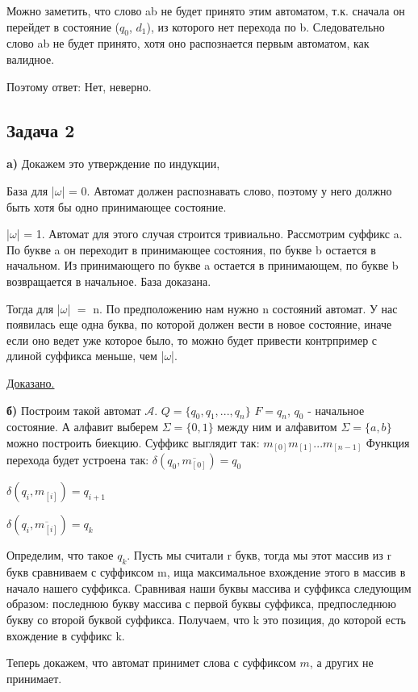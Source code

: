 \documentclass[a4paper,14pt]{article} %
\begin{document}
    Можно заметить, что слово ab не будет принято этим автоматом, т.к. сначала он перейдет в состояние ($q_0$, $d_1$), из которого нет перехода по b.
    Следовательно слово ab не будет принято, хотя оно распознается первым автоматом, как валидное.
    
    Поэтому ответ: Нет, неверно. 

\subsection{Задача 2}
\textbf{a)} Докажем это утверждение по индукции, 

База для |$\omega$| = 0. Автомат должен распознавать слово, поэтому у него должно быть хотя бы одно принимающее состояние. 
        
|$\omega$| = 1. Автомат для этого случая строится тривиально. Рассмотрим суффикс a. По букве a он переходит в принимающее состояния, по букве b остается в начальном. Из принимающего по букве a остается в принимающем, по букве b возвращается в начальное.
База доказана.

Тогда для |$\omega$| $=$ n. По предположению нам нужно n состояний автомат. У нас появилась еще одна буква, по которой должен вести в новое состояние, иначе если оно ведет уже которое было, то можно будет привести контрпример с длиной суффикса меньше, чем |$\omega$|.

\underline{Доказано.}
\vspace{5mm}

\textbf{б)} Построим такой автомат $\mathcal{A}$. 
$Q = \{ q_0, q_1, ..., q_n \}$  $F = q_n$, $q_0$ - начальное состояние.
А алфавит выберем $\Sigma = \{0, 1\}$ между ним и алфавитом $\Sigma = \{a, b \}$ можно построить биекцию.
Суффикс выглядит так: $m_{[0]}m_{[1]}...m_{[n-1]}$
Функция перехода будет устроена так: $\delta(q_0, \overline{m_{[0]}}) = q_0$

$\delta(q_i, m_{[i]}) = q_{i + 1}$

$\delta(q_i, \overline{m_{[i]}}) = q_{k}$

Определим, что такое $q_k$. Пусть мы считали r букв, тогда мы этот массив из r букв сравниваем с суффиксом m, ища максимальное вхождение этого в массив в начало нашего суффикса.
Сравнивая наши буквы массива и суффикса следующим образом: последнюю букву массива с первой буквы суффикса, предпоследнюю букву со второй буквой суффикса.
Получаем, что k это позиция, до которой есть вхождение в суффикс k.

Теперь докажем, что автомат принимет слова с суффиксом $m$, а других не принимает.
\end{document}
